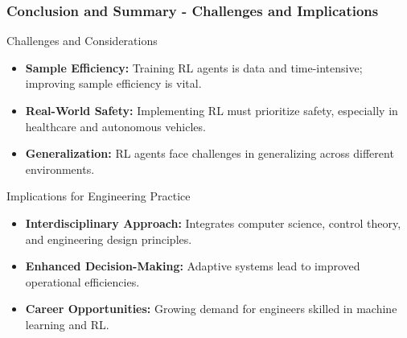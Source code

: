 \documentclass[aspectratio=169]{beamer}
\begin{document}
\begin{frame}[fragile]
    \frametitle{Conclusion and Summary - Challenges and Implications}
    \begin{block}{Challenges and Considerations}
        \begin{itemize}
            \item \textbf{Sample Efficiency:} Training RL agents is data and time-intensive; improving sample efficiency is vital.
            \item \textbf{Real-World Safety:} Implementing RL must prioritize safety, especially in healthcare and autonomous vehicles.
            \item \textbf{Generalization:} RL agents face challenges in generalizing across different environments.
        \end{itemize}
    \end{block}

    \begin{block}{Implications for Engineering Practice}
        \begin{itemize}
            \item \textbf{Interdisciplinary Approach:} Integrates computer science, control theory, and engineering design principles.
            \item \textbf{Enhanced Decision-Making:} Adaptive systems lead to improved operational efficiencies.
            \item \textbf{Career Opportunities:} Growing demand for engineers skilled in machine learning and RL.
        \end{itemize}
    \end{block}
\end{frame}
\end{document}
